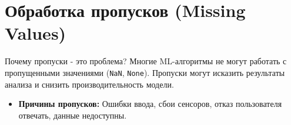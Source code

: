 
\section{Обработка пропусков (Missing Values)}

\begin{myblock}{Почему пропуски - это проблема?}
    Многие ML-алгоритмы не могут работать с пропущенными значениями (\texttt{NaN}, \texttt{None}). Пропуски могут исказить результаты анализа и снизить производительность модели.
    \begin{itemize}
        \item \textbf{Причины пропусков:} Ошибки ввода, сбои сенсоров, отказ пользователя отвечать, данные недоступны.
    \end{itemize}
\end{myblock}

